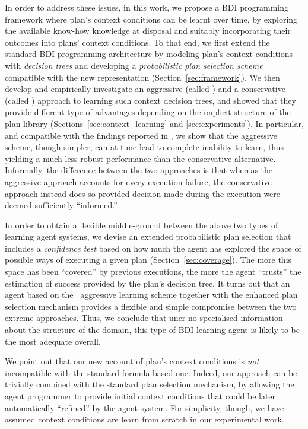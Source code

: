 In order to address these issues, in this work, we propose a BDI programming
framework where plan's context conditions can be learnt over time, by exploring
the available know-how knowledge at disposal and suitably incorporating their
outcomes into plans' context conditions.
To that end, we first extend the standard BDI programming architecture by
modeling plan's context conditions with \emph{decision trees}
\cite{Mitchell97:ML} and developing a \emph{probabilistic plan selection scheme}
compatible with the new representation (Section~\ref{sec:framework}). %
We then  develop and empirically investigate an aggressive (called \CL) and a
conservative (called \BUL) approach to learning such context decision trees, and
showed that they provide different type of advantages depending on the implicit
structure of the plan library (Sections~\ref{sec:context_learning} and
\ref{sec:experiments}). In particular, and compatible with the findings reported
in \cite{APSS08}, we show that the aggressive scheme, though simpler, can at time
lead to complete inability to learn, thus yielding a much less robust performance
than the conservative alternative.
Informally, the difference between the two approaches is that whereas the
aggressive approach accounts for every execution failure, the conservative
approach instead does so provided decision made during the execution were deemed
sufficiently ``informed.''


In order to obtain a flexible middle-ground between the above two types of
learning agent systems, we devise an extended probabilistic plan selection that
includes a \emph{confidence test} based on how much the agent has explored the
space of possible ways of executing a given plan (Section~\ref{sec:coverage}).
The more this space has been ``covered'' by previous executions, the more the
agent ``trusts'' the estimation of success provided by the plan's decision tree.
It turns out that an agent based on the \CL\ aggressive learning scheme together
with the enhanced plan selection mechanism provides a flexible and simple
compromise between the two extreme approaches.
Thus, we conclude that uner no specialised information about the structure of the
domain, this type of BDI learning agent is likely to be the most adequate
overall.



We point out that our new account of plan's context conditions is \emph{not}
incompatible with the standard formula-based one.
Indeed, our approach can be trivially combined with the standard plan selection
mechanism, by allowing the agent programmer to provide initial context conditions
that could be later automatically ``refined'' by the agent system.
For simplicity, though, we have assumed context conditions are learn from scratch
in our experimental work.





